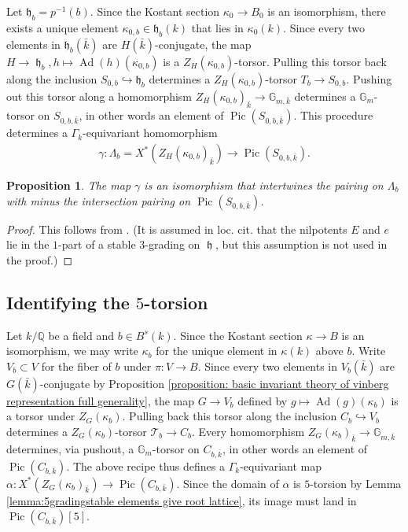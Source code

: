 \documentclass{article} %
\newtheorem{proposition}{Proposition}[section]
\numberwithin{equation}{section}
\theoremstyle{definition}
\newcommand{\G}{\mathbb{G}}
\DeclareMathOperator{\lieh}{\mathfrak{h}}
\DeclareMathOperator{\Ad}{Ad}
\DeclareMathOperator{\Pic}{Pic}
\newcommand{\Q}{\mathbb{Q}}
\newcommand{\frakh}{\mathfrak h}
\begin{document}
Let $\frakh_b = p^{-1}(b)$.
Since the Kostant section $\kappa_0\rightarrow B_0$ is an isomorphism, there exists a unique element $\kappa_{0,b} \in \frakh_b(k)$ that lies in $\kappa_0(k)$.
Since every two elements in $\frakh_b(\bar{k})$ are $H(\bar{k})$-conjugate, the map $H\rightarrow \lieh_b, h\mapsto \Ad(h)(\kappa_{0,b})$ is a $Z_H(\kappa_{0,b})$-torsor.
Pulling this torsor back along the inclusion $S_{0,b} \hookrightarrow \frakh_b$ determines a $Z_H(\kappa_{0,b})$-torsor $T_b\rightarrow S_{0,b}$.
Pushing out this torsor along a homomorphism $Z_{H}(\kappa_{0,b})_{\bar{k}} \rightarrow \G_{m,\bar{k}}$ determines a $\G_m$-torsor on $S_{0,b,\bar{k}}$, in other words an element of $\Pic(S_{0,b,\bar{k}})$.
This procedure determines a $\Gamma_k$-equivariant homomorphism 
\begin{align*}
    \gamma\colon \Lambda_b = X^*(Z_H(\kappa_{0,b})_{\bar{k}}) \rightarrow \Pic(S_{0,b,\bar{k}}).
\end{align*}


\begin{proposition}\label{proposition:isorootlatticepicardgroup}
    The map $\gamma$ is an isomorphism that intertwines the pairing on $\Lambda_b$ with minus the intersection pairing on $\Pic(S_{0,b,\bar{k}})$.
\end{proposition}
\begin{proof}
    This follows from \cite[Lemma 4.13]{Thorne-Romano-E8}.
    (It is assumed in loc. cit. that the nilpotents $E$ and $e$ lie in the $1$-part of a stable $3$-grading on $\lieh$, but this assumption is not used in the proof.)
\end{proof}

\subsection{Identifying the $5$-torsion}


Let $k/\Q$ be a field and $b\in B^s(k)$.
Since the Kostant section $\kappa\rightarrow B$ is an isomorphism, we may write $\kappa_b$ for the unique element in $\kappa(k)$ above $b$.
Write $V_b\subset V$ for the fiber of $b$ under $\pi\colon V\rightarrow B$.
Since every two elements in $V_b(\bar{k})$ are $G(\bar{k})$-conjugate by Proposition \ref{proposition: basic invariant theory of vinberg representation full generality}, the map $G\rightarrow V_b$ defined by $g\mapsto \Ad(g)(\kappa_b)$ is a torsor under $Z_G(\kappa_b)$.
Pulling back this torsor along the inclusion $C_b\hookrightarrow V_b$ determines a $Z_G(\kappa_b)$-torsor $\mathcal{T}_b\rightarrow C_b$. 
Every homomorphism $Z_G(\kappa_b)_{\bar{k}} \rightarrow \G_{m, \bar{k}}$ determines, via pushout, a $\G_m$-torsor on $C_{b,\bar{k}}$, in other words an element of $\Pic(C_{b,\bar{k}})$. 
The above recipe thus defines a $\Gamma_k$-equivariant map $\alpha\colon X^*(Z_G(\kappa_b)_{\bar{k}}) \rightarrow \Pic(C_{b,\bar{k}})$.
Since the domain of $\alpha$ is $5$-torsion by Lemma \ref{lemma:5gradingstable elements give root lattice}, its image must land in $\Pic(C_{b,\bar{k}})[5]$.
\end{document}
